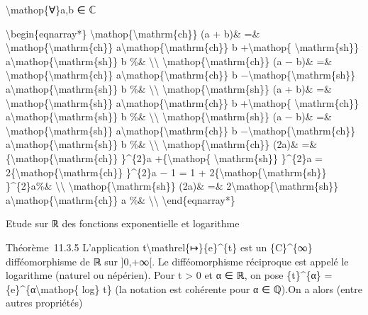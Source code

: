 \documentclass[]{article}
\begin{document}
\textbackslash{}mathop\{∀\}a,b ∈ ℂ

\textbackslash{}begin\{eqnarray*\}
\textbackslash{}mathop\{\textbackslash{}mathrm\{ch\}\} (a + b)\& =\&
\textbackslash{}mathop\{\textbackslash{}mathrm\{ch\}\}
a\textbackslash{}mathop\{\textbackslash{}mathrm\{ch\}\} b
+\textbackslash{}mathop\{ \textbackslash{}mathrm\{sh\}\}
a\textbackslash{}mathop\{\textbackslash{}mathrm\{sh\}\} b \%\&
\textbackslash{}\textbackslash{}
\textbackslash{}mathop\{\textbackslash{}mathrm\{ch\}\} (a − b)\& =\&
\textbackslash{}mathop\{\textbackslash{}mathrm\{ch\}\}
a\textbackslash{}mathop\{\textbackslash{}mathrm\{ch\}\} b
−\textbackslash{}mathop\{\textbackslash{}mathrm\{sh\}\}
a\textbackslash{}mathop\{\textbackslash{}mathrm\{sh\}\} b \%\&
\textbackslash{}\textbackslash{}
\textbackslash{}mathop\{\textbackslash{}mathrm\{sh\}\} (a + b)\& =\&
\textbackslash{}mathop\{\textbackslash{}mathrm\{sh\}\}
a\textbackslash{}mathop\{\textbackslash{}mathrm\{ch\}\} b
+\textbackslash{}mathop\{ \textbackslash{}mathrm\{ch\}\}
a\textbackslash{}mathop\{\textbackslash{}mathrm\{sh\}\} b \%\&
\textbackslash{}\textbackslash{}
\textbackslash{}mathop\{\textbackslash{}mathrm\{sh\}\} (a − b)\& =\&
\textbackslash{}mathop\{\textbackslash{}mathrm\{sh\}\}
a\textbackslash{}mathop\{\textbackslash{}mathrm\{ch\}\} b
−\textbackslash{}mathop\{\textbackslash{}mathrm\{ch\}\}
a\textbackslash{}mathop\{\textbackslash{}mathrm\{sh\}\} b \%\&
\textbackslash{}\textbackslash{}
\textbackslash{}mathop\{\textbackslash{}mathrm\{ch\}\} (2a)\& =\&
\{\textbackslash{}mathop\{\textbackslash{}mathrm\{ch\}\} \}\^{}\{2\}a
+\{\textbackslash{}mathop\{ \textbackslash{}mathrm\{sh\}\} \}\^{}\{2\}a
= 2\{\textbackslash{}mathop\{\textbackslash{}mathrm\{ch\}\} \}\^{}\{2\}a
− 1 = 1 + 2\{\textbackslash{}mathop\{\textbackslash{}mathrm\{sh\}\}
\}\^{}\{2\}a\%\& \textbackslash{}\textbackslash{}
\textbackslash{}mathop\{\textbackslash{}mathrm\{sh\}\} (2a)\& =\&
2\textbackslash{}mathop\{\textbackslash{}mathrm\{sh\}\}
a\textbackslash{}mathop\{\textbackslash{}mathrm\{ch\}\} a \%\&
\textbackslash{}\textbackslash{} \textbackslash{}end\{eqnarray*\}

Etude sur ℝ des fonctions exponentielle et logarithme

Théorème~11.3.5 L'application
t\textbackslash{}mathrel\{↦\}\{e\}\^{}\{t\} est un \{C\}\^{}\{∞\}
difféomorphisme de ℝ sur {]}0,+∞{[}. Le difféomorphisme réciproque est
appelé le logarithme (naturel ou népérien). Pour t \textgreater{} 0 et α
∈ ℝ, on pose \{t\}\^{}\{α\} = \{e\}\^{}\{α\textbackslash{}mathop\{ log\}
t\} (la notation est cohérente pour α ∈ ℚ).On a alors (entre autres
propriétés)
\end{document}
